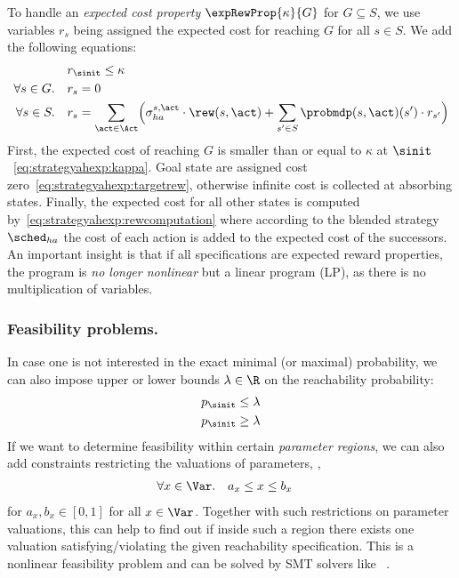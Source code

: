 	To handle an \emph{expected cost property} $\expRewProp{\kappa}{G}$ for $G\subseteq S$, we use variables $r_s$ being assigned the expected cost for reaching $G$ for all $s\in S$. We add the following equations:
%	
	\begin{align}
							 &\quad r_{\sinit}\leq \kappa\label{eq:strategyahexp:kappa}\\
			\forall s\in G.	 &\quad r_s=0\label{eq:strategyahexp:targetrew}\\
			\forall s\in S.	&\quad r_s= \sum_{\act\in\Act} \Bigl(\sigma_{ha}^{s,\act} \cdot \rew(s,\act) +    \sum_{s'\in S}	\probmdp (s,\act)(s') \cdot r_{s'}\Bigr)\label{eq:strategyahexp:rewcomputation}	
		\end{align}
		First, the expected cost of reaching $G$ is smaller than or equal to $\kappa$ at $\sinit$~\eqref{eq:strategyahexp:kappa}. Goal state are assigned cost zero~\eqref{eq:strategyahexp:targetrew}, otherwise infinite cost is collected at absorbing states. Finally, the expected cost for all other states is computed by~\eqref{eq:strategyahexp:rewcomputation} where according to the blended strategy $\sched_{ha}$ the cost of each action is added to the expected cost of the successors. 
	An important insight is that if all specifications are expected reward properties, the program is \emph{no longer nonlinear} but a linear program (LP), as there is no multiplication of variables.
%

\medskip

\subsubsection{Feasibility problems.} In case one is not interested in the exact minimal (or maximal) probability, we can also impose upper or lower bounds $\lambda\in\R$ on the reachability probability:
		\begin{align}
		p_{\sinit}\leq\lambda\\
		p_{\sinit}\geq\lambda
		\end{align}
		If we want to determine feasibility within certain \emph{parameter regions}, we can also add constraints restricting the valuations of parameters, \eg, 
	\begin{align}
		\forall x\in \Var.	 &\quad a_x\leq x\leq b_x\label{eq:region}
	\end{align}
	for $a_x,b_x\in[0,1]$ for all $x\in\Var$.
		Together with such restrictions on parameter valuations, this can help to find out if inside such a region there exists one valuation satisfying/violating the given reachability specification. This is a nonlinear feasibility problem and can be solved by SMT solvers like ~\cite{demoura_nlsat}.
		
